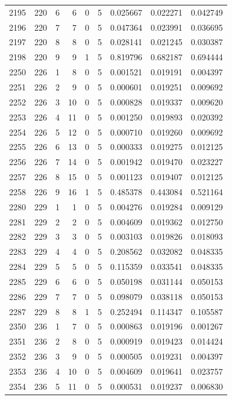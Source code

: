 \begin{longtable}{rrrrrrrrr}
2195 & 220 & 6 & 6 & 0 & 5 & 0.025667 & 0.022271 & 0.042749 \\
2196 & 220 & 7 & 7 & 0 & 5 & 0.047364 & 0.023991 & 0.036695 \\
2197 & 220 & 8 & 8 & 0 & 5 & 0.028141 & 0.021245 & 0.030387 \\
2198 & 220 & 9 & 9 & 1 & 5 & 0.819796 & 0.682187 & 0.694444 \\
2250 & 226 & 1 & 8 & 0 & 5 & 0.001521 & 0.019191 & 0.004397 \\
2251 & 226 & 2 & 9 & 0 & 5 & 0.000601 & 0.019251 & 0.009692 \\
2252 & 226 & 3 & 10 & 0 & 5 & 0.000828 & 0.019337 & 0.009620 \\
2253 & 226 & 4 & 11 & 0 & 5 & 0.001250 & 0.019893 & 0.020392 \\
2254 & 226 & 5 & 12 & 0 & 5 & 0.000710 & 0.019260 & 0.009692 \\
2255 & 226 & 6 & 13 & 0 & 5 & 0.000333 & 0.019275 & 0.012125 \\
2256 & 226 & 7 & 14 & 0 & 5 & 0.001942 & 0.019470 & 0.023227 \\
2257 & 226 & 8 & 15 & 0 & 5 & 0.001123 & 0.019407 & 0.012125 \\
2258 & 226 & 9 & 16 & 1 & 5 & 0.485378 & 0.443084 & 0.521164 \\
2280 & 229 & 1 & 1 & 0 & 5 & 0.004276 & 0.019284 & 0.009129 \\
2281 & 229 & 2 & 2 & 0 & 5 & 0.004609 & 0.019362 & 0.012750 \\
2282 & 229 & 3 & 3 & 0 & 5 & 0.003103 & 0.019826 & 0.018093 \\
2283 & 229 & 4 & 4 & 0 & 5 & 0.208562 & 0.032082 & 0.048335 \\
2284 & 229 & 5 & 5 & 0 & 5 & 0.115359 & 0.033541 & 0.048335 \\
2285 & 229 & 6 & 6 & 0 & 5 & 0.050198 & 0.031144 & 0.050153 \\
2286 & 229 & 7 & 7 & 0 & 5 & 0.098079 & 0.038118 & 0.050153 \\
2287 & 229 & 8 & 8 & 1 & 5 & 0.252494 & 0.114347 & 0.105587 \\
2350 & 236 & 1 & 7 & 0 & 5 & 0.000863 & 0.019196 & 0.001267 \\
2351 & 236 & 2 & 8 & 0 & 5 & 0.000919 & 0.019423 & 0.014424 \\
2352 & 236 & 3 & 9 & 0 & 5 & 0.000505 & 0.019231 & 0.004397 \\
2353 & 236 & 4 & 10 & 0 & 5 & 0.004609 & 0.019641 & 0.023757 \\
2354 & 236 & 5 & 11 & 0 & 5 & 0.000531 & 0.019237 & 0.006830 \\

\end{longtable}
